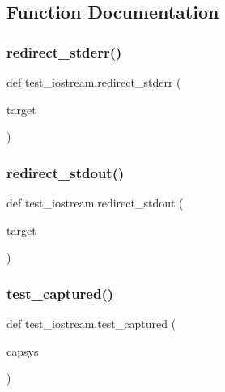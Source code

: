 \subsection{Function Documentation}
\mbox{\label{namespacetest__iostream_a29964bc8a6a68901b7f7e3b07b289531}} 
\subsubsection{\texorpdfstring{redirect\_stderr()}{redirect\_stderr()}}
{\footnotesize\ttfamily def test\+\_\+iostream.\+redirect\+\_\+stderr (\begin{DoxyParamCaption}\item[{}]{target }\end{DoxyParamCaption})}

\mbox{\label{namespacetest__iostream_ada467f909a6c828ef4f7d2b898d37dad}} 
\subsubsection{\texorpdfstring{redirect\_stdout()}{redirect\_stdout()}}
{\footnotesize\ttfamily def test\+\_\+iostream.\+redirect\+\_\+stdout (\begin{DoxyParamCaption}\item[{}]{target }\end{DoxyParamCaption})}

\mbox{\label{namespacetest__iostream_aeedc57cd3f4261b7f7f83295c6b17346}} 
\subsubsection{\texorpdfstring{test\_captured()}{test\_captured()}}
{\footnotesize\ttfamily def test\+\_\+iostream.\+test\+\_\+captured (\begin{DoxyParamCaption}\item[{}]{capsys }\end{DoxyParamCaption})}

